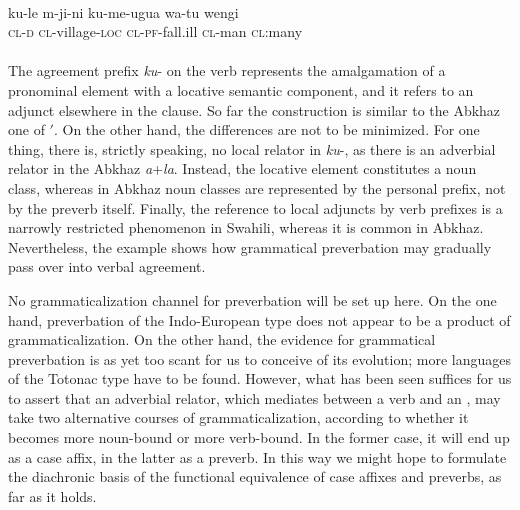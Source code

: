 \ea\label{ex:E84}
\\
\gll    ku-le  m-ji-ni  ku-me-ugua  wa-tu  wengi\\
 \textsc{cl}-\textsc{d}  \textsc{cl}-village-\textsc{loc}  \textsc{cl}-\textsc{pf}-fall.ill  \textsc{cl}-man  \textsc{cl}:many\footnotemark{}\\
\\
\z
\noindent The agreement prefix \textit{ku}{}- on the verb represents the amalgamation of a pronominal element with a locative semantic component, and it refers to an adjunct \np elsewhere in the clause. So far the construction is similar to the Abkhaz one of $'$. On the other hand, the differences are not to be minimized. For one thing, there is, strictly speaking, no local relator in \textit{ku}{}-, as there is an adverbial relator in the Abkhaz \textit{a}+\textit{la}. Instead, the locative element constitutes a noun class, whereas in Abkhaz noun classes are represented by the personal prefix, not by the preverb itself. Finally, the reference to local adjuncts by verb prefixes is a narrowly restricted phenomenon in Swahili, whereas it is common in Abkhaz. Nevertheless, the example shows how grammatical preverbation may gradually pass over into verbal agreement.

No grammaticalization channel for preverbation will be set up here. On the one hand, preverbation of the Indo-European type does not appear to be a product of grammaticalization. On the other hand, the evidence for grammatical preverbation is as yet too scant for us to conceive of its evolution; more languages of the Totonac type have to be found. However, what has been seen suffices for us to assert that an adverbial relator, which mediates between a verb and an \np, may take two alternative courses of grammaticalization, according to whether it becomes more noun-bound or more verb-bound. In the former case, it will end up as a case affix, in the latter as a preverb. In this way we might hope to formulate the diachronic basis of the functional equivalence of case affixes and preverbs, as far as it holds.

